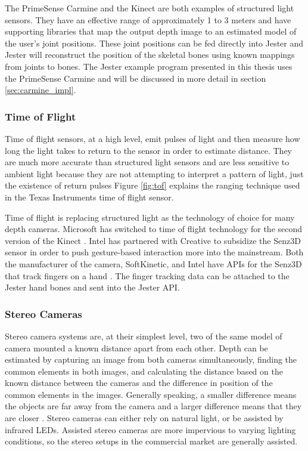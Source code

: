 The PrimeSense Carmine and the Kinect are both examples of structured light sensors. They have an effective range of approximately 1 to 3 meters and have supporting libraries that map the output depth image to an estimated model of the user’s joint positions. These joint positions can be fed directly into Jester and Jester will reconstruct the position of the skeletal bones using known mappings from joints to bones. The Jester example program presented in this thesis uses the PrimeSense Carmine and will be discussed in more detail in section \ref{sec:carmine_impl}.

\subsubsection{Time of Flight}

Time of flight sensors, at a high level, emit pulses of light and then measure how long the light takes to return to the sensor in order to estimate distance. They are much more accurate than structured light sensors and are less sensitive to ambient light because they are not attempting to interpret a pattern of light, just the existence of return pulses \cite{litime} Figure \ref{fig:tof} explains the ranging technique used in the Texas Instruments time of flight sensor. 

Time of flight is replacing structured light as the technology of choice for many depth cameras. Microsoft has switched to time of flight technology for the second version of the Kinect \cite{kinect2}. Intel has partnered with Creative to subsidize the Senz3D sensor in order to push gesture-based interaction more into the mainstream. Both the manufacturer of the camera, SoftKinetic, and Intel have APIs for the Senz3D that track fingers on a hand \cite{senz3d}. The finger tracking data can be attached to the Jester hand bones and sent into the Jester API.

\subsubsection{Stereo Cameras}

Stereo camera systems are, at their simplest level, two of the same model of camera mounted a known distance apart from each other. Depth can be estimated by capturing an image from both cameras simultaneously, finding the common elements in both images, and calculating the distance based on the known distance between the cameras and the difference in position of the common elements in the images. Generally speaking, a smaller difference means the objects are far away from the camera and a larger difference means that they are closer \cite{lucas1981iterative}. Stereo cameras can either rely on natural light, or be assisted by infrared LEDs. Assisted stereo cameras are more impervious to varying lighting conditions, so the stereo setups in the commercial market are generally assisted.

